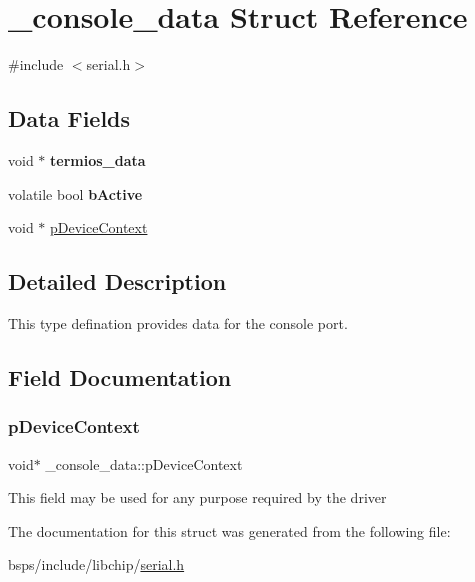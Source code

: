 \hypertarget{struct__console__data}{}\section{\+\_\+console\+\_\+data Struct Reference}
\label{struct__console__data}


{\ttfamily \#include $<$serial.\+h$>$}

\subsection*{Data Fields}
\begin{DoxyCompactItemize}
\item 
\mbox{\label{struct__console__data_af3df380f743b7c0209a1de9d2ccf16df}} 
void $\ast$ {\bfseries termios\+\_\+data}
\item 
\mbox{\label{struct__console__data_a86e1171745be7231f4cdcfda4fa357f6}} 
volatile bool {\bfseries b\+Active}
\item 
void $\ast$ \mbox{\hyperlink{struct__console__data_a5454643cbc99ace320b91704514b3ffb}{p\+Device\+Context}}
\end{DoxyCompactItemize}


\subsection{Detailed Description}
This type defination provides data for the console port. 

\subsection{Field Documentation}
\mbox{\label{struct__console__data_a5454643cbc99ace320b91704514b3ffb}} 
\subsubsection{\texorpdfstring{pDeviceContext}{pDeviceContext}}
{\footnotesize\ttfamily void$\ast$ \+\_\+console\+\_\+data\+::p\+Device\+Context}

This field may be used for any purpose required by the driver 

The documentation for this struct was generated from the following file\+:\begin{DoxyCompactItemize}
\item 
bsps/include/libchip/\mbox{\hyperlink{serial_8h}{serial.\+h}}\end{DoxyCompactItemize}
